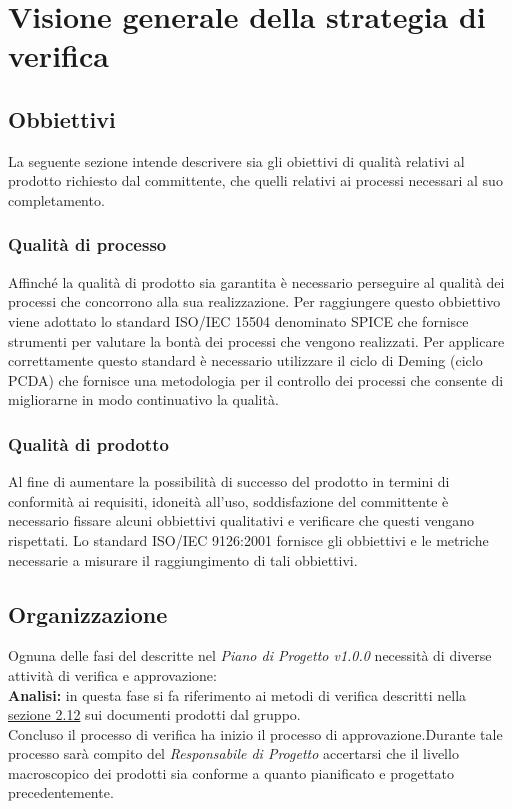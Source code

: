 \chapter{Visione generale della strategia di verifica}
\section{Obbiettivi}
La seguente sezione intende descrivere sia gli obiettivi di qualità relativi al prodotto
richiesto dal committente, che quelli relativi ai processi necessari al suo completamento.
\subsection{Qualità di processo}
Affinché la qualità di prodotto sia garantita è necessario perseguire al qualità dei processi che concorrono alla sua realizzazione. Per raggiungere questo obbiettivo viene adottato lo standard ISO/IEC 15504 denominato SPICE che fornisce strumenti per valutare la bontà dei processi che vengono realizzati.
Per applicare correttamente questo standard è necessario utilizzare il ciclo di Deming (ciclo PCDA) che fornisce una metodologia per il controllo dei processi che consente di migliorarne in modo continuativo la qualità. 
\subsection{Qualità di prodotto}
Al fine di aumentare la possibilità di successo del prodotto in termini di conformità ai requisiti, idoneità all'uso, soddisfazione del committente è necessario fissare alcuni obbiettivi qualitativi e verificare che questi vengano rispettati.
Lo standard ISO/IEC 9126:2001 fornisce gli obbiettivi e le metriche necessarie a misurare il raggiungimento di tali obbiettivi.
\section{Organizzazione}
Ognuna delle fasi del  descritte nel \textit{Piano di Progetto v1.0.0} necessità di diverse attività di verifica e approvazione:\\\newline
 \textbf{Analisi:} in questa fase si fa riferimento ai metodi di verifica descritti nella \hyperref[Metodi]{sezione 2.12} sui documenti prodotti dal gruppo.\\ \newline
Concluso il processo di verifica ha inizio il processo di approvazione.Durante tale processo sarà compito del \textit{Responsabile di Progetto} accertarsi che il livello macroscopico dei prodotti sia conforme a quanto pianificato e progettato precedentemente.
